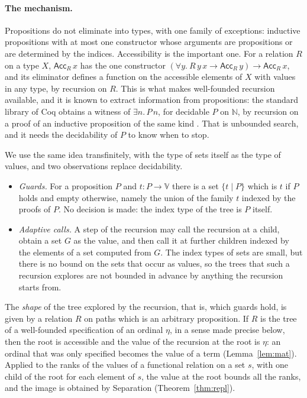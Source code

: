 \documentclass[10pt]{article}
\theoremstyle{definition}
\theoremstyle{remark}
\newcommand{\N}{\mathbb{N}}
\newcommand{\Acc}{\mathsf{Acc}}
\newcommand{\V}{\mathbb{V}}
\newcommand{\guard}[2]{\{#1\mid #2\}}
\begin{document}
\paragraph{The mechanism.}
Propositions do not eliminate into types, with one family of exceptions:
inductive propositions with at most one constructor whose arguments are
propositions or are determined by the indices. Accessibility is the
important one. For a relation $R$ on a type $X$, $\Acc_R\,x$ has the one
constructor $(\forall y.\ R\,y\,x\to\Acc_R\,y)\to\Acc_R\,x$, and its eliminator
defines a function on the accessible elements of $X$ with values in any
type, by recursion on $R$. This is what makes well-founded recursion
available, and it is known to extract information from propositions:
the standard library of Coq obtains a witness of $\exists n.\,P\,n$, for
decidable $P$ on $\N$, by recursion on a proof of an inductive
proposition of the same kind \cite{constructiveepsilon}. That is unbounded search, and it needs the
decidability of $P$ to know when to stop.

We use the same idea transfinitely, with the type of sets itself as the
type of values, and two observations replace decidability.
\begin{itemize}
\item \emph{Guards.} For a proposition $P$ and $t:P\to\V$ there is a set
  $\guard{t}{P}$ which is $t$ if $P$ holds and empty otherwise, namely
  the union of the family $t$ indexed by the proofs of $P$. No decision is made:
  the index type of the tree is $P$ itself.
\item \emph{Adaptive calls.} A step of the recursion may call the
  recursion at a child, obtain a set $G$ as the value, and then call it
  at further children indexed by the elements of a set computed from
  $G$. The index types of sets are small, but there is no bound on the
  sets that occur as values, so the trees that such a recursion explores
  are not bounded in advance by anything the recursion starts from.
\end{itemize}
The \emph{shape} of the tree explored by the recursion, that is, which
guards hold, is given by a relation $R$ on paths which is an arbitrary
proposition. If $R$ is the tree of a well-founded specification of an
ordinal $\eta$, in a sense made precise below, then the root is accessible
and the value of the recursion at the root is $\eta$: an ordinal that was
only specified becomes the value of a term
(Lemma~\ref{lem:mat}). Applied to the ranks of the values of a
functional relation on a set $s$, with one child of the root for each
element of $s$, the value at the root bounds all the ranks, and the
image is obtained by Separation (Theorem~\ref{thm:repl}).
\end{document}
